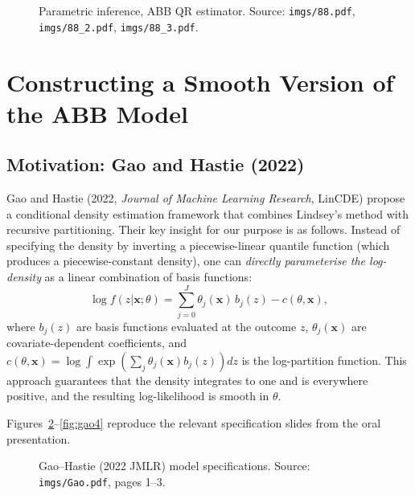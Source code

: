 \documentclass[12pt]{article}
\begin{document}
\begin{figure}[H]
\centering
\caption{Parametric inference, ABB QR estimator.
Source: \texttt{imgs/88.pdf}, \texttt{imgs/88\_2.pdf}, \texttt{imgs/88\_3.pdf}.}
\label{fig:asymp3}
\end{figure}

\section{Constructing a Smooth Version of the ABB Model}
\label{sec:smooth}

\subsection{Motivation: Gao and Hastie (2022)}

Gao and Hastie (2022, \textit{Journal of Machine Learning Research}, LinCDE)
propose a conditional density estimation framework that combines Lindsey's
method with recursive partitioning.
Their key insight for our purpose is as follows.
Instead of specifying the density by inverting a piecewise-linear quantile
function (which produces a piecewise-constant density), one can
\emph{directly parameterise the log-density} as a linear combination of
basis functions:
\begin{equation}\label{eq:lindsey}
\log f(z|\mathbf{x};\theta)=\sum_{j=0}^J\theta_j(\mathbf{x})\,b_j(z)-c(\theta,\mathbf{x}),
\end{equation}
where $b_j(z)$ are basis functions evaluated at the outcome $z$,
$\theta_j(\mathbf{x})$ are covariate-dependent coefficients, and
$c(\theta,\mathbf{x})=\log\int\exp(\sum_j\theta_j(\mathbf{x})b_j(z))dz$
is the log-partition function.
This approach guarantees that the density integrates to one and is everywhere
positive, and the resulting log-likelihood is smooth in $\theta$.

Figures~\ref{fig:gao1}--\ref{fig:gao4} reproduce the relevant specification
slides from the oral presentation.

\begin{figure}[H]
\centering
\caption{Gao--Hastie (2022 JMLR) model specifications.
Source: \texttt{imgs/Gao.pdf}, pages 1--3.}
\label{fig:gao1}
\end{figure}
\end{document}
